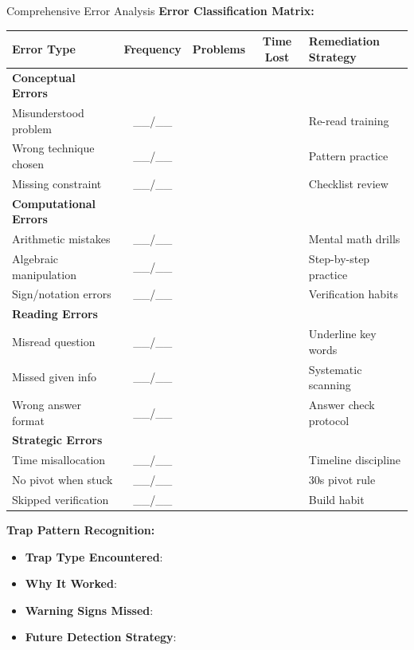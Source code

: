 \documentclass{article}
\begin{document}
\begin{analysisbox}{Comprehensive Error Analysis}
\textbf{Error Classification Matrix:}
\begin{center}
\begin{tabular}{|l|c|c|c|l|}
\hline
\textbf{Error Type} & \textbf{Frequency} & \textbf{Problems} & \textbf{Time Lost} & \textbf{Remediation Strategy} \\
\hline
\textbf{Conceptual Errors} & & & & \\
\quad Misunderstood problem & \_\_/\_\_ & & & Re-read training \\
\quad Wrong technique chosen & \_\_/\_\_ & & & Pattern practice \\
\quad Missing constraint & \_\_/\_\_ & & & Checklist review \\
\hline
\textbf{Computational Errors} & & & & \\
\quad Arithmetic mistakes & \_\_/\_\_ & & & Mental math drills \\
\quad Algebraic manipulation & \_\_/\_\_ & & & Step-by-step practice \\
\quad Sign/notation errors & \_\_/\_\_ & & & Verification habits \\
\hline
\textbf{Reading Errors} & & & & \\
\quad Misread question & \_\_/\_\_ & & & Underline key words \\
\quad Missed given info & \_\_/\_\_ & & & Systematic scanning \\
\quad Wrong answer format & \_\_/\_\_ & & & Answer check protocol \\
\hline
\textbf{Strategic Errors} & & & & \\
\quad Time misallocation & \_\_/\_\_ & & & Timeline discipline \\
\quad No pivot when stuck & \_\_/\_\_ & & & 30s pivot rule \\
\quad Skipped verification & \_\_/\_\_ & & & Build habit \\
\hline
\end{tabular}
\end{center}

\textbf{Trap Pattern Recognition:}
\begin{itemize}[nosep]
\item[$\square$] \textbf{Trap Type Encountered}: \underline{\hspace{6cm}}
\item[$\square$] \textbf{Why It Worked}: \underline{\hspace{7cm}}
\item[$\square$] \textbf{Warning Signs Missed}: \underline{\hspace{6cm}}
\item[$\square$] \textbf{Future Detection Strategy}: \underline{\hspace{5.5cm}}
\end{itemize}


\end{analysisbox}
\end{document}
